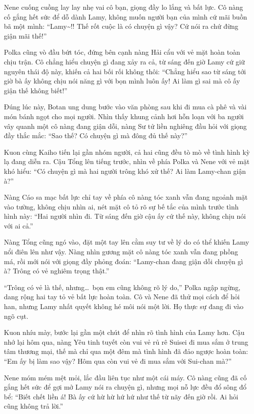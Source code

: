\documentclass[../main.tex]{subfiles}
\begin{document}
Nene cuống cuồng lay lay nhẹ vai cô bạn, giọng đầy lo lắng và bất lực. Cô nàng cố gắng hết sức để dỗ dành Lamy, không muốn người bạn của mình cứ mãi buồn bã một mình: ``Lamy\~{}!! Thế rốt cuộc là có chuyện gì vậy? Cứ nói ra chứ đừng giận mãi thế!''

Polka cũng vò đầu bứt tóc, đứng bên cạnh nàng Hải cẩu với vẻ mặt hoàn toàn chịu trận. Cô chẳng hiểu chuyện gì đang xảy ra cả, từ sáng đến giờ Lamy cứ giữ nguyên thái độ này, khiến cả hai bối rối không thôi: ``Chẳng hiểu sao từ sáng tới giờ bà ấy không chịu nói năng gì với bọn mình luôn ấy! Ai làm gì sai mà cô ấy giận thế không biết!''

Đúng lúc này, Botan ung dung bước vào văn phòng sau khi đi mua cà phê và vài món bánh ngọt cho mọi người. Nhìn thấy khung cảnh hơi hỗn loạn với ba người vây quanh một cô nàng đang giận dỗi, nàng Sư tử liền nghiêng đầu hỏi với giọng đầy thắc mắc: ``Sao thế? Có chuyện gì mà đông đủ thế này?''

Kuon cùng Kaiho tiến lại gần nhóm người, cả hai cũng đều tò mò về tình hình kỳ lạ đang diễn ra. Cậu Tổng lên tiếng trước, nhìn về phía Polka và Nene với vẻ mặt khó hiểu: ``Có chuyện gì mà hai người trông khó xử thế? Ai làm Lamy-chan giận à?''

Nàng Cáo sa mạc bất lực chỉ tay về phía cô nàng tóc xanh vẫn đang ngoảnh mặt vào tường, không chịu nhìn ai, nét mặt cô tỏ rõ sự bế tắc của mình trước tình hình này: ``Hai người nhìn đi. Từ sáng đến giờ cậu ấy cứ thế này, không chịu nói với ai cả.''

Nàng Tổng cũng ngó vào, đặt một tay lên cằm suy tư về lý do có thể khiến Lamy nổi điên lên như vậy. Nàng nhìn gương mặt cô nàng tóc xanh vẫn đang phồng má, rồi mới nói với giọng đầy phỏng đoán: ``Lamy-chan đang giận dỗi chuyện gì à? Trông có vẻ nghiêm trọng thật.''

``Trông có vẻ là thế, nhưng\dots\ bọn em cũng không rõ lý do,'' Polka ngập ngừng, dang rộng hai tay tỏ vẻ bất lực hoàn toàn. Cô và Nene đã thử mọi cách để hỏi han, nhưng Lamy nhất quyết không hé môi nói một lời. Họ thực sự đang đi vào ngõ cụt.

Kuon nhíu mày, bước lại gần một chút để nhìn rõ tình hình của Lamy hơn. Cậu nhớ lại hôm qua, nàng Yêu tinh tuyết còn vui vẻ rủ rê Suisei đi mua sắm ở trung tâm thương mại, thế mà chỉ qua một đêm mà tình hình đã đảo ngược hoàn toàn: ``Em ấy bị làm sao vậy? Hôm qua còn vui vẻ đi mua sắm với Sui-chan mà?''

Nene móm mém mệt mỏi, lắc đầu liên tục như một cái máy. Cô nàng cũng đã cố gắng hết sức để gợi mở Lamy nói ra chuyện gì, nhưng mọi nỗ lực đều đổ sông đổ bể: ``Biết chết liền á! Bà ấy cứ hừ hừ hứ hứ như thế từ nãy đến giờ rồi. Ai hỏi cũng không trả lời.''
\end{document}
